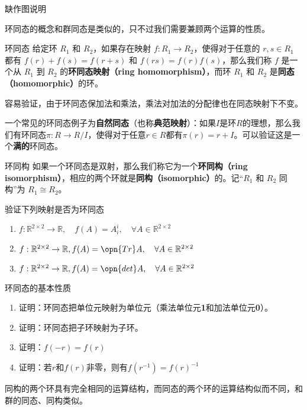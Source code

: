 
\begin{issues}
\issueTODO 缺作图说明
\end{issues}


环同态的概念和群同态是类似的，只不过我们需要兼顾两个运算的性质。


\begin{definition}{环同态}
给定环 $R_1$ 和 $R_2$，如果存在映射 $f:R_1\rightarrow R_2$，使得对于任意的 $r, s\in R_1$ 都有 $f(r)+f(s)=f(r+s)$ 和 $f(rs)=f(r)f(s)$，那么我们称 $f$ 是一个从 $R_1$ 到 $R_2$ 的\textbf{环同态映射（ring homomorphism）}，而环 $R_1$ 和 $R_2$ 是\textbf{同态（homomorphic）}的环。
\end{definition}
容易验证，由于环同态保加法和乘法，乘法对加法的分配律也在同态映射下不变。

一个常见的环同态例子为\textbf{自然同态}（也称\textbf{典范映射}）：如果$I$是环$R$的理想，那么我们有环同态$\pi:R\rightarrow R/I$，使得对于任意$r\in R$都有$\pi (r)=r+I$。可以验证这是一个\textbf{满的}环同态。
\begin{definition}{环同构}
如果一个环同态是双射，那么我们称它为一个\textbf{环同构（ring isomorphism）}，相应的两个环就是\textbf{同构（isomorphic）}的。记“$R_1$ 和 $R_2$ 同构”为 $R_1\cong R_2$。
\end{definition}
\begin{exercise}{验证下列映射是否为环同态}
\begin{enumerate}
\item $f:\mathbb R^{2\times 2}\rightarrow \mathbb R,\quad f(A)=A^i_i,\quad \forall A\in \mathbb R^{2\times 2}$
\item $f:\mathbb R^{2\times 2}\rightarrow \mathbb R,f(A)=\opn {Tr}A,\quad \forall A\in \mathbb R^{2\times 2}$
\item $f:\mathbb R^{2\times 2}\rightarrow \mathbb R,f(A)=\opn {det}A,\quad \forall A\in \mathbb R^{2\times 2}$
\end{enumerate}
\end{exercise}
\begin{exercise}{环同态的基本性质}
\begin{enumerate}
\item 证明：环同态把单位元映射为单位元（乘法单位元\textbf{1}和加法单位元\textbf{0}）。
\item 证明：环同态把子环映射为子环。
\item 证明：$f(-r)=f(r)$
\item 证明：若$r$和$f(r)$非零，则有$f(r^{-1})=f(r)^{-1}$
\end{enumerate}
\end{exercise}
同构的两个环具有完全相同的运算结构，而同态的两个环的运算结构似而不同，和群的同态、同构类似。

